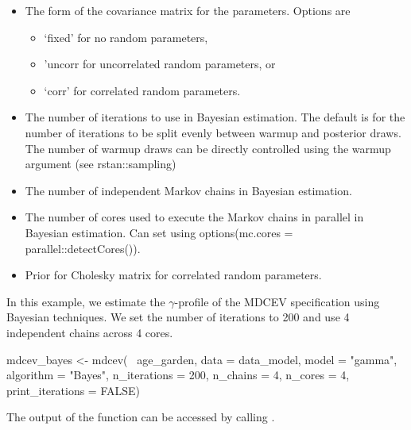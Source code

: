 \begin{itemize}
\item
   The form of the covariance matrix for the
  parameters. Options are

  \begin{itemize}
  \tightlist
  \item
    `fixed' for no random parameters,
  \item
    'uncorr for uncorrelated random parameters, or
  \item
    `corr' for correlated random parameters.
  \end{itemize}
\item
   The number of iterations to use in Bayesian
  estimation. The default is for the number of iterations to be split
  evenly between warmup and posterior draws. The number of warmup draws
  can be directly controlled using the warmup argument (see
  rstan::sampling)
\item
   The number of independent Markov chains in Bayesian
  estimation.
\item
   The number of cores used to execute the Markov chains
  in parallel in Bayesian estimation. Can set using options(mc.cores =
  parallel::detectCores()).
\item
   Prior for Cholesky matrix for correlated
  random parameters.
\end{itemize}

In this example, we estimate the \(\gamma\)-profile of the MDCEV
specification using Bayesian techniques. We set the number of iterations
to 200 and use 4 independent chains across 4 cores.

\begin{example}
mdcev_bayes <- mdcev(~ age_garden,
                        data = data_model,
                        model = "gamma",
                        algorithm = "Bayes",
                        n_iterations = 200,
                        n_chains = 4,
                        n_cores = 4,
                        print_iterations = FALSE)
\end{example}

The output of the function can be accessed by calling .

